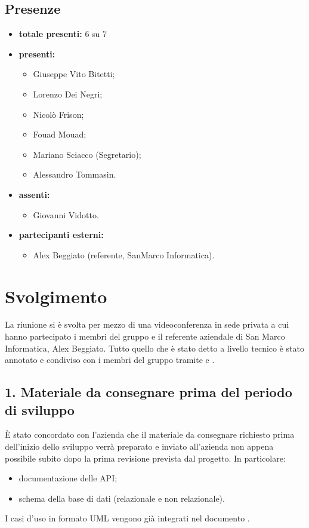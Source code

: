 \subsection*{Presenze}
	\begin{itemize}
		\item \textbf{totale presenti:} 6 su 7
		\item \textbf{presenti: }
			\begin{itemize}			
				\item Giuseppe Vito Bitetti;
				\item Lorenzo Dei Negri;
				\item Nicolò Frison;
				\item Fouad Mouad;
				\item Mariano Sciacco (Segretario);
				\item Alessandro Tommasin.
			\end{itemize}
		\item \textbf{assenti: } 
			\begin{itemize}	
				\item Giovanni Vidotto.
			\end{itemize}
		\item \textbf{partecipanti esterni:}
			\begin{itemize}
				\item Alex Beggiato (referente, SanMarco Informatica).
			\end{itemize}
	\end{itemize}


\newpage
\section*{Svolgimento}

	La riunione si è svolta per mezzo di una videoconferenza in sede privata a cui hanno partecipato i membri del gruppo e il referente aziendale di San Marco Informatica, Alex Beggiato. Tutto quello che è stato detto a livello tecnico è stato annotato e condiviso con i membri del gruppo tramite  e .

	\subsection*{1. Materiale da consegnare prima del periodo di sviluppo}

	È stato concordato con l'azienda che il materiale da consegnare richiesto prima dell'inizio dello sviluppo verrà preparato e inviato all'azienda non appena possibile subito dopo la prima revisione prevista dal progetto. In particolare:
	\begin{itemize}
		\item documentazione delle API;
		\item schema della base di dati (relazionale e non relazionale).
	\end{itemize}
	I casi d'uso in formato UML vengono già integrati nel documento .

